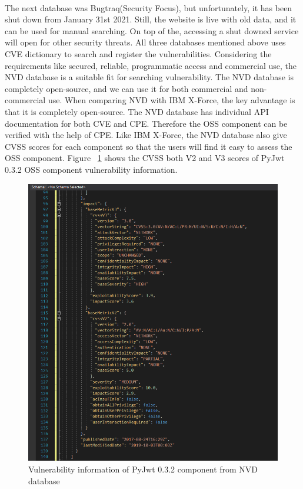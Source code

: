 \paragraph{}
The next database was Bugtraq(Security Focus), but unfortunately, it has been shut down from January 31st 2021\cite{Cat2021}. Still, the website is live with old data, and it can be used for manual searching. On top of the, accessing a shut downed service will open for other security threats. All three databases mentioned above uses \acs{CVE} dictionary to search and register the vulnerabilities. Considering the requirements like secured, reliable, programmatic access and commercial use, the \acs{NVD} database is a suitable fit for searching vulnerability. The \acs{NVD} database is completely open-source, and we can use it for both commercial and non-commercial use. When comparing \acs{NVD} with IBM X-Force, the key advantage is that it is completely open-source. The \acs{NVD} database has individual API documentation for both \acs{CVE} and \acs{CPE}. Therefore the \acs{OSS} component can be verified with the help of \acs{CPE}. Like IBM X-Force, the \acs{NVD} database also give \acs{CVSS} scores for each component so that the users will find it easy to assess the \acs{OSS} component. Figure ~\ref{fig:nvdOutput} shows the \acs{CVSS} both V2 and V3 scores of PyJwt 0.3.2 \acs{OSS} component vulnerability information. 
\begin{figure}[H]
	\includegraphics[width=15cm]{includes/nvdOutput.PNG}
	\centering
	\caption{Vulnerability information of PyJwt 0.3.2 component from \acs{NVD} database}
	\label{fig:nvdOutput}
\end{figure}

